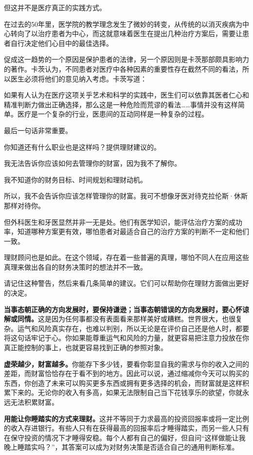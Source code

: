 但这并不是医疗真正的实践方式。

在过去的50年里，医学院的教学理念发生了微妙的转变，从传统的以消灭疾病为中心转向了以治疗患者为中心，而这就意味着医生在提出几种治疗方案后，需要让患者自行决定他们心目中的最佳选择。

促成这一趋势的一个原因是保护患者的法律，另一个原因则是卡茨那部颇具影响力的著作。卡茨认为，不同患者对医疗中各种因素的重要性存在截然不同的看法，所以医生必须将他们的意见纳入考虑。卡茨写道：

{\kaishu

如果有人认为在医疗这项关乎艺术和科学的实践中，医生们可以依靠其医者仁心和精准判断力做出正确选择，那么这是一种危险而荒谬的看法……事情并没有这样简单。医疗是一个复杂的行业，医患间的互动同样是一种复杂的过程。

}

最后一句话非常重要。

你知道还有什么职业也是这样吗？提供理财建议的。

我无法告诉你应该如何去管理你的财富，因为我不了解你。

我不知道你的财务目标、时间规划和理财动机。

所以，我不会告诉你应该怎样管理你的财富。我可不想像牙医对待克拉伦斯·休斯那样对待你。

但外科医生和牙医显然并非一无是处。他们有医学知识，能评估治疗方案的成功率，知道哪种方案更有效，哪怕患者对最适合自己的治疗方案的判断不一定和他们一致。

理财顾问也是如此。在这个领域，存在着一些普遍的真理，哪怕不同人在应用这些真理来做出各自的财务决策时的想法并不一致。

请记住这种警告，然后来看几条简单的建议。它们可以帮助你在理财方面做出更好的决定。

\textbf{当事态朝正确的方向发展时，要保持谦逊；当事态朝错误的方向发展时，要心怀谅解或同情。}这是因为任何事都没有表面看来那样美好或糟糕。世界很大，也很复杂。运气和风险真实存在，也难以判别，所以无论是在评价自己还是他人时，都要将这句话牢记于心。你如果能尊重运气和风险的力量，就更容易把注意力投放在你真正能控制的事上，也就更容易找到正确的参照对象。

\textbf{虚荣越少，财富越多。}你能存下多少钱，要看你彰显自我的需求与你的收入之间的差距，而财富恰恰存在于看不到的地方。因此可以说，通过缩减你今天可以购买的东西，你创造了未来可以购买更多东西或拥有更多选择的机会，而财富就是这样积累下来的。无论你的收入有多高，如果无法限制自己当下花钱享乐的欲望，你就永远无法积累财富。

\textbf{用能让你睡踏实的方式来理财。}这并不等同于力求最高的投资回报率或将一定比例的收入存进银行。有些人只有在获得最高的回报率后才睡得踏实，而另一些人只有在保守投资的情况下才睡得安稳。每个人都有自己的偏好，但自问“这样做能让我晚上睡踏实吗？”，其答案可以成为对财务决策是否适合自己的通用判断标准。


